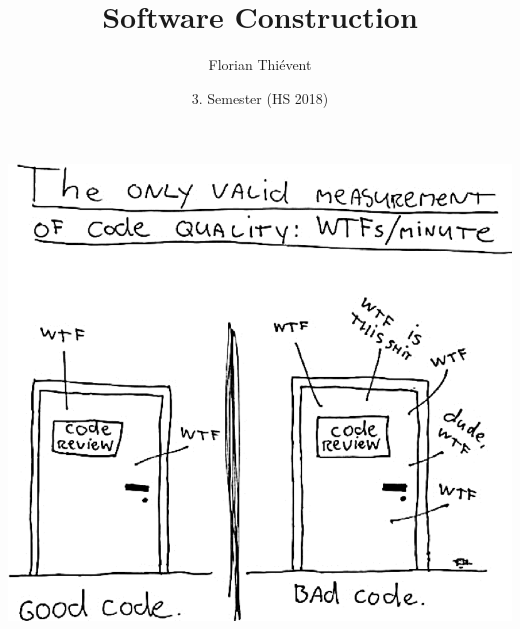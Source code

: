 \documentclass[10pt]{article}
\title{
\vspace{2cm}
\textbf{Software Construction}
}
\author{Florian Thi\'event}
\date{3. Semester (HS 2018)}
\begin{document}
    \maketitle
    \begin{center}
        \vspace{3cm}
        \includegraphics{assets/Titelbild.png}
        \thispagestyle{fancy}
    \end{center}
    \newpage

    \tableofcontents
    \newpage
    \setcounter{page}{1}

\end{document}

